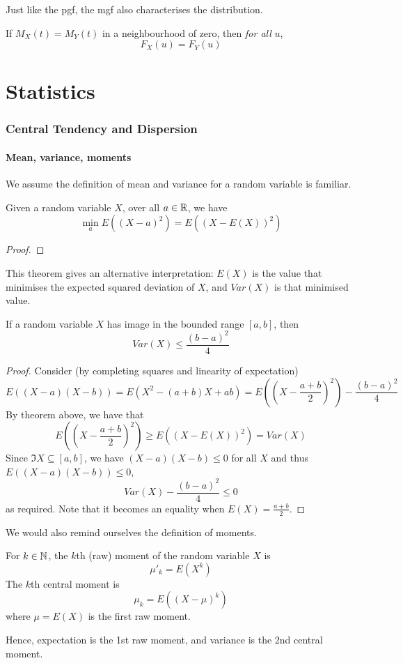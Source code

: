 \documentclass[11pt]{article}
\begin{document}
Just like the pgf, the mgf also characterises the distribution.
\begin{theorem}
  If \(M_X(t)=M_Y(t)\) in a neighbourhood of zero, then \emph{for all} \(u\),
  \[F_X(u)=F_Y(u)\]
\end{theorem}

\pagebreak
\part{Statistics}
\section{Central Tendency and Dispersion}
\subsection{Mean, variance, moments}
We assume the definition of mean and variance for a random variable is familiar.
\begin{theorem}
  Given a random variable \(X\), over all \(a\in\mathbb{R}\), we have
  \[\min_a E((X-a)^2)=E((X-E(X))^2)\]
\end{theorem}
\begin{proof}
  
\end{proof}
This theorem gives an alternative interpretation: \(E(X)\) is the value that minimises the expected squared deviation of \(X\), and \(Var(X)\) is that minimised value.

\begin{proposition}
  If a random variable \(X\) has image in the bounded range \([a,b]\), then 
  \[Var(X)\leq\frac{(b-a)^2}{4}\]
\end{proposition}
\begin{proof}
  Consider (by completing squares and linearity of expectation)
  \[E((X-a)(X-b))=E(X^2-(a+b)X+ab)=E\left(\left(X-\frac{a+b}{2}\right)^2\right)-\frac{(b-a)^2}{4}\]
  By theorem above, we have that 
  \[E\left(\left(X-\frac{a+b}{2}\right)^2\right) \geq E((X-E(X))^2)=Var(X)\]
  Since \(\Im X\subseteq [a,b]\), we have \((X-a)(X-b)\leq 0\) for all \(X\) and thus \(E((X-a)(X-b))\leq 0\),
  \[Var(X)-\frac{(b-a)^2}{4}\leq 0\]
  as required. Note that it becomes an equality when \(E(X)=\frac{a+b}{2}\).
\end{proof}

We would also remind ourselves the definition of moments.
\begin{definition}
  For \(k\in\mathbb{N}\), the \(k\)th (raw) moment of the random variable \(X\) is
  \[\mu'_k=E(X^k)\]
  The \(k\)th central moment is
  \[\mu_k=E((X-\mu)^k)\]
  where \(\mu=E(X)\) is the first raw moment.
\end{definition}
Hence, expectation is the 1st raw moment, and variance is the 2nd central moment.
\end{document}
